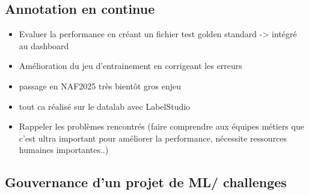 \subsection{Annotation en continue}

\begin{itemize}
    \item Evaluer la performance en créant un fichier test golden standard -> intégré au dashboard
    \item Amélioration du jeu d'entrainement en corrigeant les erreurs
    \item passage en NAF2025 très bientôt gros enjeu
    \item tout ca réalisé sur le datalab avec LabelStudio
    \item Rappeler les problèmes rencontrés (faire comprendre aux équipes métiers que c'est ultra important pour améliorer la performance, nécessite ressources humaines importantes..)
\end{itemize}


\subsection{Gouvernance d'un projet de ML/ challenges}


